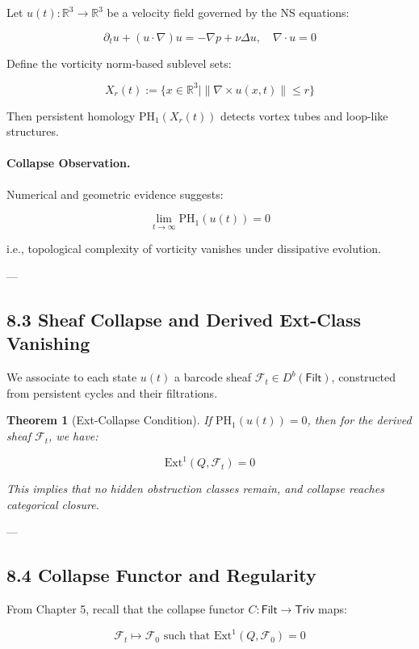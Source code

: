 \documentclass[11pt]{article}
\newtheorem{theorem}{Theorem}[section]
\begin{document}
Let \( u(t): \mathbb{R}^3 \to \mathbb{R}^3 \) be a velocity field governed by the NS equations:

\[
\partial_t u + (u \cdot \nabla)u = -\nabla p + \nu \Delta u, \quad \nabla \cdot u = 0
\]

Define the vorticity norm-based sublevel sets:

\[
X_r(t) := \{ x \in \mathbb{R}^3 \mid \| \nabla \times u(x,t) \| \leq r \}
\]

Then persistent homology \( \mathrm{PH}_1(X_r(t)) \) detects vortex tubes and loop-like structures.

\paragraph{Collapse Observation.}
Numerical and geometric evidence suggests:

\[
\lim_{t \to \infty} \mathrm{PH}_1(u(t)) = 0
\]

i.e., topological complexity of vorticity vanishes under dissipative evolution.

---

\subsection*{8.3 Sheaf Collapse and Derived Ext-Class Vanishing}

We associate to each state \( u(t) \) a barcode sheaf \( \mathcal{F}_t \in D^b(\mathsf{Filt}) \),  
constructed from persistent cycles and their filtrations.  

\begin{theorem}[Ext-Collapse Condition]
If \( \mathrm{PH}_1(u(t)) = 0 \), then for the derived sheaf \( \mathcal{F}_t \), we have:

\[
\mathrm{Ext}^1(Q, \mathcal{F}_t) = 0
\]

This implies that no hidden obstruction classes remain, and collapse reaches categorical closure.
\end{theorem}

---

\subsection*{8.4 Collapse Functor and Regularity}

From Chapter 5, recall that the collapse functor \( C: \mathsf{Filt} \to \mathsf{Triv} \) maps:

\[
\mathcal{F}_t \mapsto \mathcal{F}_0 \text{ such that } \mathrm{Ext}^1(Q, \mathcal{F}_0) = 0
\]
\end{document}
